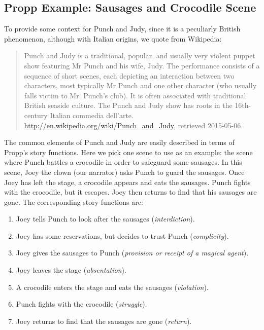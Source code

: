 \documentclass{llncs}
\begin{document}
\subsection{Propp Example: Sausages and Crocodile Scene}\label{sec:pjexample}
To provide some context for Punch and Judy, since it is a peculiarly British phenomenon, although with Italian origins, we quote from Wikipedia:
\begin{quote}\small
Punch and Judy is a traditional, popular, and usually very violent puppet show featuring Mr Punch and his wife, Judy. The performance consists of a sequence of short scenes, each depicting an interaction between two characters, most typically Mr Punch and one other character (who usually falls victim to Mr. Punch's club). It is often associated with traditional British seaside culture.
The Punch and Judy show has roots in the 16th-century Italian commedia dell'arte. \\
\hfill{\footnotesize
\url{http://en.wikipedia.org/wiki/Punch_and_Judy}, retrieved 2015-05-06.}
\end{quote}

The common elements of Punch and Judy are easily described in terms of Propp's story functions. Here we pick one scene to use as an example: the scene where Punch battles a crocodile in order to safeguard some sausages.  In this scene, Joey the clown (our narrator) asks Punch to guard the sausages. Once Joey has left the stage, a crocodile appears and eats the sausages. Punch fights with the crocodile, but it escapes. Joey then returns to find that his sausages are gone.
The corresponding story functions are:
\begin{enumerate}
  \item Joey tells Punch to look after the sausages (\emph{interdiction}).
  \item Joey has some reservations, but decides to trust Punch (\emph{complicity}).
  \item Joey gives the sausages to Punch (\emph{provision or receipt of a magical agent}).
  \item Joey leaves the stage (\emph{absentation}).
  \item A crocodile enters the stage and eats the sausages (\emph{violation}).
  \item Punch fights with the crocodile (\emph{struggle}).
  \item Joey returns to find that the sausages are gone (\emph{return}).
\end{enumerate}
\end{document}
